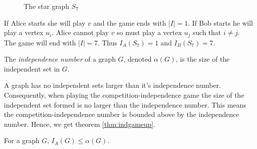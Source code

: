 \begin{figure}[h]
    \centering
    \caption{The star graph $S_7$}
    \label{fig:starS7}
\end{figure}

If Alice starts she will play $v$ and the game ends with $|I| = 1$. If Bob starts he will play a vertex $u_i$. Alice cannot play $v$ so must play a vertex $u_j$ such that $i\neq j$. The game will end with $|I| = 7$. Thus $I_A(S_7)=1$ and $I_B(S_7)=7$.

\begin{definition}
    The \textit{independence number} of a graph $G$, denoted $\alpha(G)$, is the size of the independent set in $G$.
\end{definition}

A graph has no independent sets larger than it's independence number. Consequently, when playing the competition-independence game the size of the independent set formed is no larger than the  independence number. This means the competition-independence number is bounded above by the independence number. Hence, we get theorem \ref{thm:indgameup}.

\begin{theorem}\label{thm:indgameup}
    For a graph $G$, $I_A(G)\leq \alpha(G)$.    
\end{theorem}



